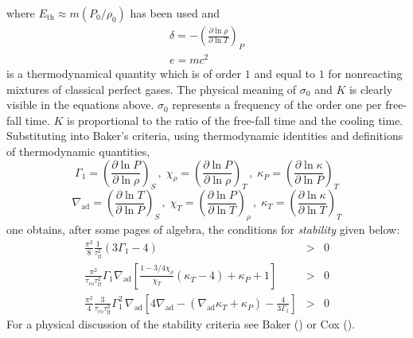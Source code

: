\documentclass{layout}
\begin{document}
   where $ E_{\mathrm{th}} \approx m (P_0/{\rho_0})$ has been used and
   \begin{equation}
   \begin{array}{l}
      \delta = - \left(
                    \frac{ \partial \ln \rho }{ \partial \ln T }
                 \right)_P \\
      e=mc^2
   \end{array}
   \end{equation}
   is a thermodynamical quantity which is of order $1$ and equal to $1$
   for nonreacting mixtures of classical perfect gases. The physical
   meaning of $ \sigma_0 $ and $K$ is clearly visible in the equations
   above. $\sigma_0$ represents a frequency of the order one per
   free-fall time. $K$ is proportional to the ratio of the free-fall
   time and the cooling time. Substituting into Baker's criteria, using
   thermodynamic identities and definitions of thermodynamic quantities,
   \begin{displaymath}
      \Gamma_1      = \left( \frac{ \partial \ln P}{ \partial\ln \rho}
                           \right)_{S}    \, , \;
      \chi^{}_\rho  = \left( \frac{ \partial \ln P}{ \partial\ln \rho}
                           \right)_{T}    \, , \;
      \kappa^{}_{P} = \left( \frac{ \partial \ln \kappa}{ \partial\ln P}
                           \right)_{T}
   \end{displaymath}
   \begin{displaymath}
      \nabla_{\mathrm{ad}} = \left( \frac{ \partial \ln T}
                             { \partial\ln P} \right)_{S} \, , \;
      \chi^{}_T       = \left( \frac{ \partial \ln P}
                             { \partial\ln T} \right)_{\rho} \, , \;
      \kappa^{}_{T}   = \left( \frac{ \partial \ln \kappa}
                             { \partial\ln T} \right)_{T}
   \end{displaymath}
   one obtains, after some pages of algebra, the conditions for
   \emph{stability\/} given
   below:
   \begin{eqnarray}
      \frac{\pi^2}{8} \frac{1}{\tau_{\mathrm{ff}}^2}
                ( 3 \Gamma_1 - 4 )
         & > & 0 \label{ZSDynSta} \\
      \frac{\pi^2}{\tau_{\mathrm{co}}
                   \tau_{\mathrm{ff}}^2}
                   \Gamma_1 \nabla_{\mathrm{ad}}
                   \left[ \frac{ 1- 3/4 \chi^{}_\rho }{ \chi^{}_T }
                          ( \kappa^{}_T - 4 )
                        + \kappa^{}_P + 1
                   \right]
        & > & 0 \label{ZSSecSta} \\
     \frac{\pi^2}{4} \frac{3}{\tau_{ \mathrm{co} }
                              \tau_{ \mathrm{ff} }^2
                             }
         \Gamma_1^2 \, \nabla_{\mathrm{ad}} \left[
                                   4 \nabla_{\mathrm{ad}}
                                   - ( \nabla_{\mathrm{ad}} \kappa^{}_T
                                     + \kappa^{}_P
                                     )
                                   - \frac{4}{3 \Gamma_1}
                                \right]
        & > & 0   \label{ZSVibSta}
   \end{eqnarray}
%
   For a physical discussion of the stability criteria see Baker
   (\cite{baker}) or Cox (\cite{cox}).
\end{document}
